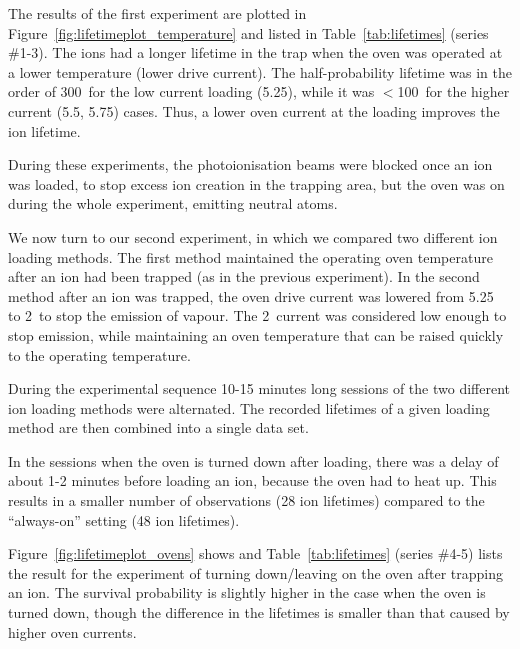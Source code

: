 The results of the first experiment are plotted in Figure~\ref{fig:lifetimeplot_temperature} and listed in Table~\ref{tab:lifetimes} (series \#1-3). The ions had a longer lifetime in the trap when the \CaI{} oven was operated at a lower temperature (lower drive current). The half-probability lifetime was in the order of 300\s\, for the low current loading (5.25\A), while it was $<$100\s\, for the higher current (5.5\A, 5.75\A) cases. Thus, a lower \CaI{} oven current at the loading improves the ion lifetime. 

During these experiments, the photoionisation beams were blocked once an ion was loaded, to stop excess ion creation in the trapping area, but the \CaI{} oven was on during the whole experiment, emitting neutral \CaI{} atoms.

We now turn to our second experiment, in which we compared two different ion loading methods. The first method maintained the operating oven temperature after an ion had been trapped (as in the previous experiment). In the second method after an ion was trapped, the \CaI{} oven drive current was lowered from 5.25\A\, to 2\A\, to stop the emission of \CaI{} vapour. The 2\A\, current was considered low enough to stop \CaI{} emission, while maintaining an oven temperature that can be raised quickly to the operating temperature.

During the experimental sequence 10-15 minutes long sessions of the two different ion loading methods were alternated. The recorded lifetimes of a given loading method are then combined into a single data set. 

In the sessions when the oven is turned down after loading, there was a delay of about 1-2 minutes before loading an ion, because the oven had to heat up. This results in a smaller number of observations (28 ion lifetimes) compared to the ``always-on'' setting (48 ion lifetimes). 

Figure~\ref{fig:lifetimeplot_ovens} shows and Table~\ref{tab:lifetimes} (series \#4-5) lists the result for the experiment of turning down/leaving on the \CaI{} oven after trapping an ion.  The survival probability is slightly higher in the case when the oven is turned down, though the difference in the lifetimes is smaller than that caused by higher oven currents.

